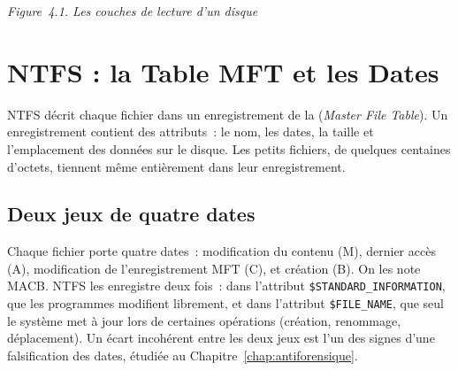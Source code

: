 \begin{center}
\end{center}
\begin{center}{\small\itshape Figure~4.1. Les couches de lecture d'un disque}\end{center}

\section{NTFS : la Table MFT et les Dates}
\label{sec:c04-ntfs}

NTFS décrit chaque fichier dans un enregistrement de la  (\textit{Master File Table}). Un enregistrement contient des
attributs~: le nom, les dates, la taille et l'emplacement des données sur le
disque. Les petits fichiers, de quelques centaines d'octets, tiennent même
entièrement dans leur enregistrement.

\subsection{Deux jeux de quatre dates}

Chaque fichier porte quatre dates~: modification du contenu (M), dernier
accès (A), modification de l'enregistrement MFT (C), et création (B). On les
note MACB. NTFS les enregistre deux fois~: dans l'attribut
\texttt{\$STANDARD\_INFORMATION}, que les programmes modifient librement,
et dans l'attribut \texttt{\$FILE\_NAME}, que seul le système met à jour lors
de certaines opérations (création, renommage, déplacement). Un écart
incohérent entre les deux jeux est l'un des signes d'une falsification des
dates, étudiée au Chapitre~\ref{chap:antiforensique}.

